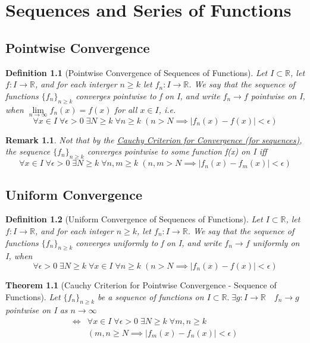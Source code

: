 \documentclass[11pt, oneside]{book}
\theoremstyle{break}
\newtheorem{thm}{Theorem}[section]
\newtheorem*{remark}{Remark}
\newtheorem{defn}{Definition}[section]
\newcommand{\bb}[1]{\mathbb{#1}}			%
\begin{document}
\chapter{Sequences and Series of Functions}

\section{Pointwise Convergence}

\begin{defn}[Pointwise Convergence of Sequences of Functions]
	Let $I \subset \bb{R}$, let $f: I \to \bb{R}$, and for each interger $n \geq k$ let $f_n : I \to \bb{R}$. We say that the sequence of functions $\{f_n\}_{n \geq k}$ converges pointwise to f on I, and write $f_n \to f$ pointwise on I, when $\lim\limits_{n \to \infty} f_n(x) = f(x)$ for all $x \in I$, i.e.
	\[
		\forall x \in I \; \forall \epsilon > 0 \; \exists N \geq k \; \forall n \geq k \; (n > N \implies |f_n(x) - f(x)| < \epsilon)
	\]
\end{defn}

\begin{remark}
	Not that by the \hyperref[CauchyCriterion_Seq]{Cauchy Criterion for Convergence (for sequences)}, the sequence $\{f_n\}_{n \geq k}$ converges pointwise to some function f(x) on I iff
	\[
		\forall x \in I \; \forall \epsilon > 0 \; \exists N \geq k \; \forall n, m \geq k \; (n, m > N \implies |f_n(x) - f_m(x)| < \epsilon)
	\]
\end{remark}


\section{Uniform Convergence}

\begin{defn}[Uniform Convergence of Sequences of Functions]
	Let $I \subset \bb{R}$, let $f: I \to \bb{R}$, and for each integer $n \geq k$, let $f_n: I \to \bb{R}$. We say that the sequence of functions $\{f_n\}_{n \geq k}$ converges uniformly to f on I, and write $f_n \to f$ uniformly on I, when
	\[
		\forall \epsilon > 0 \; \exists N \geq k \; \forall x \in I \; \forall n \geq k \; (n > N \implies |f_n(x) - f(x)| < \epsilon)
	\]
\end{defn}

\begin{thm}[Cauchy Criterion for Pointwise Convergence - Sequence of Functions]\label{Cauchy_pointwise_seq_fn}
	Let $\{f_n\}_{n \geq k}$ be a sequence of functions on $I \subset \bb{R}. \; \exists g: I \to \bb{R} \quad f_n \to g$ pointwise on I as $n \to \infty$ 
	\begin{align*}
		\iff &\forall x \in I \; \forall \epsilon > 0 \; \exists N \geq k \; \forall m, n \geq k \\
			 &( m, n \geq N \implies |f_m(x) - f_n(x)| < \epsilon )
	\end{align*}
\end{thm}
\end{document}
